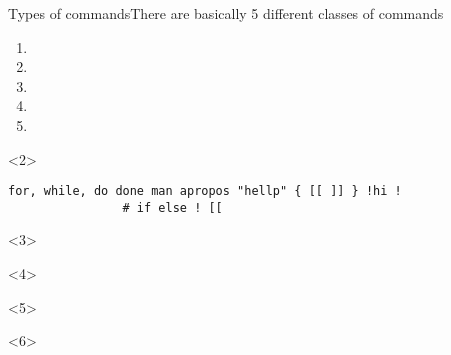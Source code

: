 \begin{frame}[fragile]{Types of commands}{There are basically 5 different classes of commands}
    \vspace{-3mm}
    \setlength{\columnsep}{-5mm}
    \begin{multicols}{5}
        \begin{enumerate}
            \item {}
            \item {}
            \item {}
            \item {}
            \item {}
        \end{enumerate}
    \end{multicols}
    \begin{overlayarea}{\textwidth}{0.7\textheight}
        \begin{onlyenv}<2>
            \begin{lstlisting}[style=MyBash]
                for, while, do done man apropos "hellp" { [[ ]] } !hi ! 
                # if else ! [[
            \end{lstlisting}
        \end{onlyenv}
        \begin{onlyenv}<3>
            
        \end{onlyenv}
        \begin{onlyenv}<4>
            
        \end{onlyenv}
        \begin{onlyenv}<5>
            
        \end{onlyenv}
        \begin{onlyenv}<6>
            
        \end{onlyenv}
    \end{overlayarea}
\end{frame}
